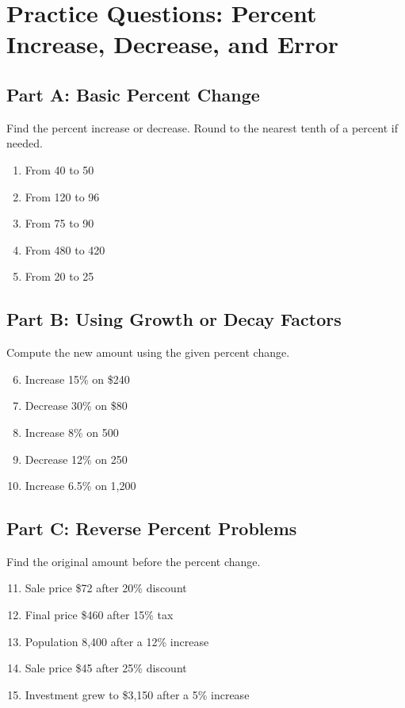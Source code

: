 \documentclass[12pt]{article}
\begin{document}
\newpage


\section*{Practice Questions: Percent Increase, Decrease, and Error}

\subsection*{Part A: Basic Percent Change}
Find the percent increase or decrease. Round to the nearest tenth of a percent if needed.
\begin{enumerate}
  \item From 40 to 50
  \item From 120 to 96
  \item From 75 to 90
  \item From 480 to 420
  \item From 20 to 25
\end{enumerate}

\subsection*{Part B: Using Growth or Decay Factors}
Compute the new amount using the given percent change.
\begin{enumerate}
  \setcounter{enumi}{5}
  \item Increase 15\% on \$240
  \item Decrease 30\% on \$80
  \item Increase 8\% on 500
  \item Decrease 12\% on 250
  \item Increase 6.5\% on 1,200
\end{enumerate}

\subsection*{Part C: Reverse Percent Problems}
Find the original amount before the percent change.
\begin{enumerate}
  \setcounter{enumi}{10}
  \item Sale price \$72 after 20\% discount
  \item Final price \$460 after 15\% tax
  \item Population 8,400 after a 12\% increase
  \item Sale price \$45 after 25\% discount
  \item Investment grew to \$3,150 after a 5\% increase
\end{enumerate}
\end{document}
